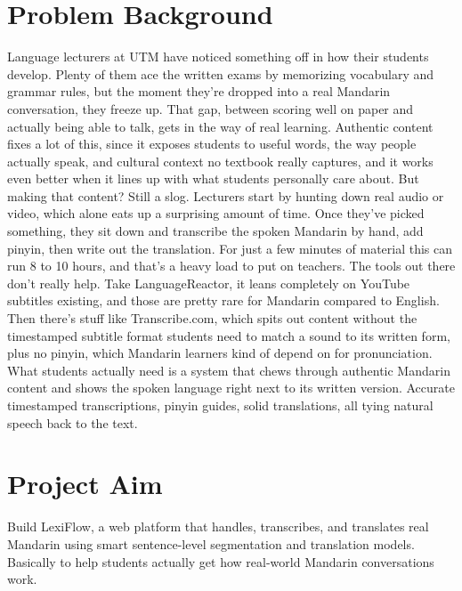 \section{Problem Background}Language lecturers at UTM have noticed something off in how their students develop. Plenty of them ace the written exams by memorizing vocabulary and grammar rules, but the moment they're dropped into a real Mandarin conversation, they freeze up. That gap, between scoring well on paper and actually being able to talk, gets in the way of real learning. Authentic content fixes a lot of this, since it exposes students to useful words, the way people actually speak, and cultural context no textbook really captures, and it works even better when it lines up with what students personally care about. But making that content? Still a slog. Lecturers start by hunting down real audio or video, which alone eats up a surprising amount of time. Once they've picked something, they sit down and transcribe the spoken Mandarin by hand, add pinyin, then write out the translation. For just a few minutes of material this can run 8 to 10 hours, and that's a heavy load to put on teachers. The tools out there don't really help. Take LanguageReactor, it leans completely on YouTube subtitles existing, and those are pretty rare for Mandarin compared to English. Then there's stuff like Transcribe.com, which spits out content without the timestamped subtitle format students need to match a sound to its written form, plus no pinyin, which Mandarin learners kind of depend on for pronunciation. What students actually need is a system that chews through authentic Mandarin content and shows the spoken language right next to its written version. Accurate timestamped transcriptions, pinyin guides, solid translations, all tying natural speech back to the text.
\section{Project Aim}Build LexiFlow, a web platform that handles, transcribes, and translates real Mandarin using smart sentence-level segmentation and translation models. Basically to help students actually get how real-world Mandarin conversations work.
